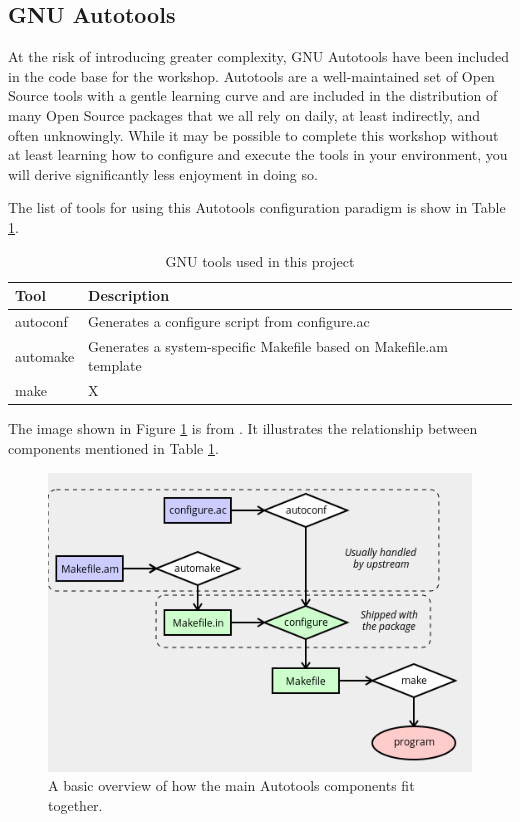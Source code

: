 \subsection{\label{sec:autotools}GNU Autotools}

\justifying
At the risk of introducing greater complexity, GNU Autotools have been included in the code base for the workshop. Autotools
are a well-maintained set of Open Source tools with a gentle learning curve and are included in the distribution of many Open
Source packages that we all rely on daily, at least indirectly, and often unknowingly. While it may be possible to complete this workshop
without at least learning how to configure and execute the tools in your environment, you will derive significantly less enjoyment
in doing so.
\vspace{2mm}

\justifying
The list of tools for using this Autotools configuration paradigm is show in Table \ref{Autotools}.
\vspace{2mm}

\begin{table}[ht]
	\centering
	\begin{tabular}{|l|l|}\hline
		Tool & Description \\\hline
		autoconf & Generates a configure script from configure.ac   \\\hline
		automake & Generates a system-specific Makefile based on Makefile.am template    \\\hline
		make  &   X    \\\hline
	\end{tabular}
	\caption{GNU tools used in this project}
	\label{Autotools}
\end{table}
\vspace{2mm}

\justifying
The image shown in Figure \ref{diagram} is from \cite{autobasics}.
It illustrates the relationship between components mentioned in Table \ref{Autotools}.
\vspace{2mm}

\begin{figure}[ht]
	\includegraphics[width=12cm]{images/diagram.png}
	\caption{A basic overview of how the main Autotools components fit together.}
	\label{diagram}
\end{figure}
\vspace{2mm}

